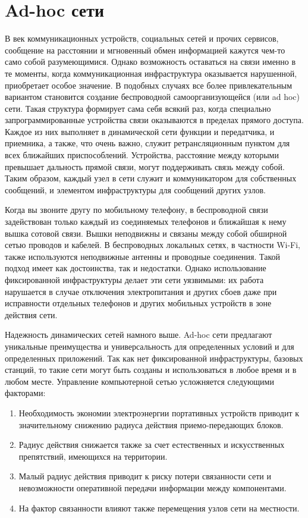 \section{Ad-hoc сети}

В век коммуникационных устройств, социальных сетей и прочих сервисов, сообщение на расстоянии и мгновенный обмен информацией кажутся чем-то само собой разумеющимися. Однако возможность оставаться на связи именно в те моменты, когда коммуникационная инфраструктура оказывается нарушенной, приобретает особое значение. В подобных случаях все более привлекательным вариантом становится создание беспроводной самоорганизующейся (или ad hoc) сети. Такая структура формирует сама себя всякий раз, когда специально запрограммированные устройства связи оказываются в пределах прямого доступа. Каждое из них выполняет в динамической сети функции и передатчика, и приемника, а также, что очень важно, служит ретрансляционным пунктом для всех ближайших приспособлений. Устройства, расстояние между которыми превышает дальность прямой связи, могут поддерживать связь между собой. Таким образом, каждый узел в сети служит и коммуникатором для собственных сообщений, и элементом инфраструктуры для сообщений других узлов.

Когда вы звоните другу по мобильному телефону, в беспроводной связи задействован только каждый из соединяемых телефонов и ближайшая к нему
вышка сотовой связи. Вышки неподвижны и связаны между собой обширной сетью проводов и кабелей. В беспроводных локальных сетях, в частности Wi-Fi, также используются неподвижные антенны и проводные соединения. Такой подход имеет как достоинства, так и недостатки. Однако использование фиксированной инфраструктуры делает эти сети уязвимыми: их работа нарушается в случае отключения электропитания и других сбоев даже при исправности отдельных телефонов и других мобильных устройств в зоне действия сети.

Надежность динамических сетей намного выше. Ad-hoc сети предлагают уникальные преимущества и универсальность для определенных условий и для определенных приложений. Так как нет фиксированной инфраструктуры, базовых станций, то такие сети могут быть созданы и использоваться в любое время и в любом месте. Управление компьютерной сетью усложняется следующими факторами:
\begin{enumerate}
\item Необходимость экономии электроэнергии портативных устройств приводит к значительному снижению радиуса действия приемо-передающих блоков.
\item Радиус действия снижается также за счет естественных и искусственных препятствий, имеющихся на территории.
\item Малый радиус действия приводит к риску потери связанности сети и невозможности оперативной передачи информации между компонентами.
\item На фактор связанности влияют также перемещения узлов сети на местности.
\end{enumerate}

